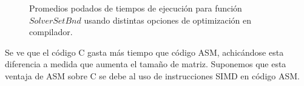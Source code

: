 \begin{figure}[htbp]
\centering


\caption{Promedios podados de tiempos de ejecución para función $Solver Set Bnd$ usando distintas opciones de optimización en compilador.} \label{fig:lego}
\end{figure}

Se ve que el código C gasta más tiempo que código ASM, achicándose esta diferencia a medida que aumenta el tamaño de matriz. Suponemos que esta ventaja de ASM sobre C se debe al uso de instrucciones SIMD en código ASM.


